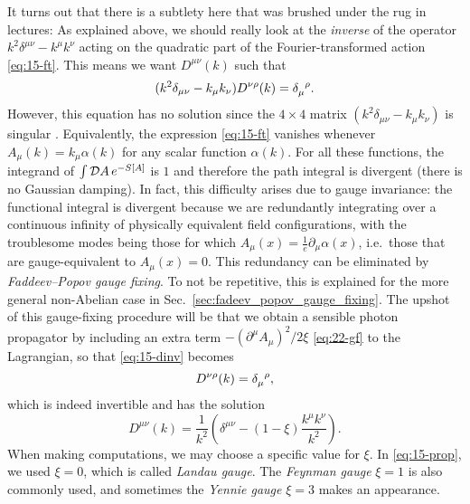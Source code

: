 \begin{leftbar}
  \begin{remark}
    It turns out that there is a subtlety here that was brushed under the rug in lectures:
    As explained above, we should really look at the \emph{inverse} of the operator $k^2 \delta^{\mu\nu} - k^{\mu} k^{\nu}$ acting on the quadratic part of the Fourier-transformed action \eqref{eq:15-ft}.
    This means we want $D^{\mu\nu}(k)$ such that
    \begin{equation}
      \label{eq:15-dinv}
      (k^2 \delta_{\mu\nu} - k_{\mu} k_{\nu}) D^{\nu\rho}(k) = \delta\indices{_{\mu}^{\rho}}.
    \end{equation}
    However, this equation has no solution since the $4 \times 4$ matrix $(k^2 \delta_{\mu\nu} - k_{\mu} k_{\nu})$ is singular \cite[Sec.~9.4]{peskin}.
    Equivalently, the expression \eqref{eq:15-ft} vanishes whenever $A_{\mu}(k) = k_{\mu} \alpha(k)$ for any scalar function $\alpha(k)$. For all these functions, the integrand of $\int \mathop{\mathcal{D} A} e^{-S[A]}$ is $1$ and therefore the path integral is divergent (there is no Gaussian damping).
    In fact, this difficulty arises due to gauge invariance: the functional integral is divergent because we are redundantly integrating over a continuous infinity of physically equivalent field configurations, with the troublesome modes being those for which $A_{\mu}(x) = \frac{1}{e} \partial_{\mu} \alpha(x)$, i.e.~those that are gauge-equivalent to $A_{\mu}(x) = 0$.
    This redundancy can be eliminated by \emph{Faddeev--Popov gauge fixing}. To not be repetitive, this is explained for the more general non-Abelian case in Sec.~\ref{sec:fadeev_popov_gauge_fixing}. The upshot of this gauge-fixing procedure will be that we obtain a sensible photon propagator by including an extra term $-(\partial^{\mu} A_{\mu})^2 / 2 \xi$ \eqref{eq:22-gf} to the Lagrangian, so that \eqref{eq:15-dinv} becomes
    \begin{equation}
      [k^2 \delta_{\mu\nu} - (1-\frac{1}{\xi} k_{\mu} k_{\nu})] D^{\nu\rho}(k) = \delta\indices{_{\mu}^{\rho}},
    \end{equation}
    which is indeed invertible and has the solution
    \begin{equation}
      D^{\mu\nu}(k) = \frac{1}{k^2} \left( \delta^{\mu\nu} - (1-\xi) \frac{k^{\mu} k^{\nu}}{k^2} \right).
    \end{equation}
    When making computations, we may choose a specific value for $\xi$. In \eqref{eq:15-prop}, we used $\xi = 0$, which is called \emph{Landau gauge}. The \emph{Feynman gauge} $\xi = 1$ is also commonly used, and sometimes the \emph{Yennie gauge} $\xi = 3$ makes an appearance.
  \end{remark}
\end{leftbar}

